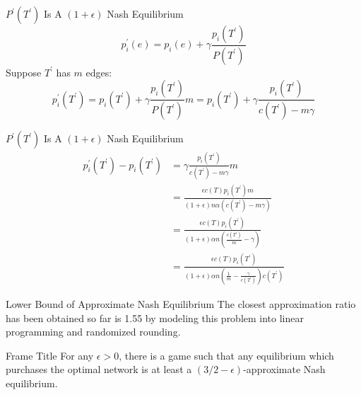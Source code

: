\documentclass[11pt,aspectratio=169]{beamer}
\begin{document}
\begin{frame}{$P^{'}(T^{'})$ Is A $(1+\epsilon)$ Nash Equilibrium}
    \[p_i^{'}(e) = p_i(e) + \gamma\frac{p_i(T^{'})}{P(T^{'})}\]
    \vspace{10pt}
    Suppose $T^{'}$ has $m$ edges:
    \[p_i^{'}(T^{'}) = p_i(T^{'}) + \gamma\frac{p_i(T^{'})}{P(T^{'})}m = p_i(T^{'}) + \gamma\frac{p_i(T^{'})}{c(T^{'}) - m\gamma}\]
    
\end{frame}

\begin{frame}{$P^{'}(T^{'})$ Is A $(1+\epsilon)$ Nash Equilibrium}
    \begin{align*}
    p_i^{'}(T^{'}) - p_i(T^{'}) &=  \gamma\frac{p_i(T^{'})}{c(T^{'}) - m\gamma}m\\  &= \frac{\epsilon c(T) p_i(T^{'}) m }{(1+\epsilon)n\alpha(c(T^{'}) - m\gamma)}  \\ &=  \frac{\epsilon c(T) p_i(T^{'})}{(1+\epsilon)\alpha n(\frac{c(T^{'})}{m} - \gamma)} \\ &=  \frac{\epsilon c(T) p_i(T^{'})}{(1+\epsilon)\alpha n(\frac{1}{m} - \frac{\gamma}{c(T^{'})})c(T^{'})}   
    \end{align*}
\end{frame}
\begin{frame}{Lower Bound of Approximate Nash Equilibrium}
    The closest approximation ratio has been obtained so far is 1.55 by modeling this problem into linear programming and randomized rounding.
\end{frame}

\begin{frame}{Frame Title}
For any $\epsilon > 0$, there is a game such that any equilibrium which purchases the optimal network is at least a $(3/2-\epsilon)$-approximate Nash equilibrium.
\end{frame}
\end{document}
